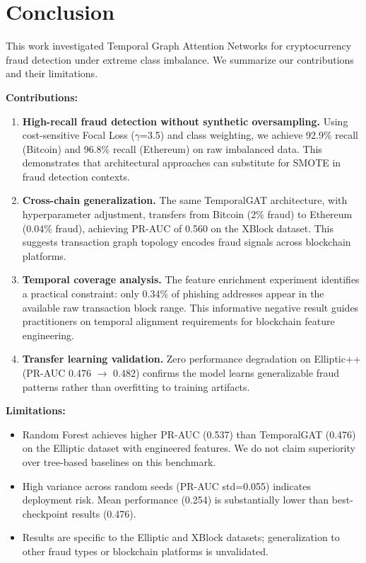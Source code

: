 \documentclass[12pt,a4paper]{article}
\begin{document}
\section{Conclusion}

This work investigated Temporal Graph Attention Networks for cryptocurrency fraud detection under extreme class imbalance. We summarize our contributions and their limitations.

\textbf{Contributions:}
\begin{enumerate}
    \item \textbf{High-recall fraud detection without synthetic oversampling.} Using cost-sensitive Focal Loss ($\gamma$=3.5) and class weighting, we achieve 92.9\% recall (Bitcoin) and 96.8\% recall (Ethereum) on raw imbalanced data. This demonstrates that architectural approaches can substitute for SMOTE in fraud detection contexts.
    
    \item \textbf{Cross-chain generalization.} The same TemporalGAT architecture, with hyperparameter adjustment, transfers from Bitcoin (2\% fraud) to Ethereum (0.04\% fraud), achieving PR-AUC of 0.560 on the XBlock dataset. This suggests transaction graph topology encodes fraud signals across blockchain platforms.
    
    \item \textbf{Temporal coverage analysis.} The feature enrichment experiment identifies a practical constraint: only 0.34\% of phishing addresses appear in the available raw transaction block range. This informative negative result guides practitioners on temporal alignment requirements for blockchain feature engineering.
    
    \item \textbf{Transfer learning validation.} Zero performance degradation on Elliptic++ (PR-AUC 0.476 $\rightarrow$ 0.482) confirms the model learns generalizable fraud patterns rather than overfitting to training artifacts.
\end{enumerate}

\textbf{Limitations:}
\begin{itemize}
    \item Random Forest achieves higher PR-AUC (0.537) than TemporalGAT (0.476) on the Elliptic dataset with engineered features. We do not claim superiority over tree-based baselines on this benchmark.
    \item High variance across random seeds (PR-AUC std=0.055) indicates deployment risk. Mean performance (0.254) is substantially lower than best-checkpoint results (0.476).
    \item Results are specific to the Elliptic and XBlock datasets; generalization to other fraud types or blockchain platforms is unvalidated.
\end{itemize}
\end{document}
